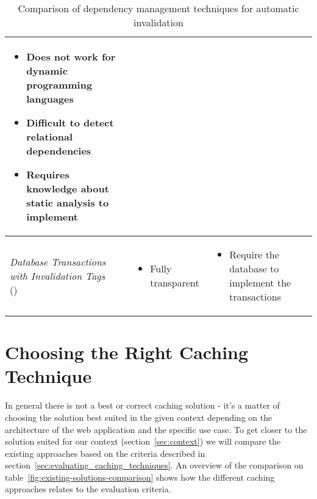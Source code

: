 \begin{table}[ht!]
\begin{tabular}{lll}
{{\begin{itemize}[leftmargin=0.75em]
          \item Does not work for dynamic programming languages
          \item Difficult to detect relational dependencies
          \item Requires knowledge about static analysis to implement
        \end{itemize}
      }
    } \\
    \hline
    {
      \parbox{3.5cm}{
        \emph{Database Transactions with Invalidation Tags} \\ (\cite{paper:liskov})
      }
    } & {
      \parbox{3.5cm}{
        \begin{itemize}[leftmargin=0.75em]
          \item Fully transparent
        \end{itemize}
      }
    } & {
      \parbox{3.5cm}{
        \begin{itemize}[leftmargin=0.75em]
          \item Require the database to implement the transactions
        \end{itemize}
      }
    } \\
    \hline
  \end{tabular}
  \caption{Comparison of dependency management techniques for automatic invalidation}
  \label{fig:dependency-management-comparison}
\end{table}



\section{Choosing the Right Caching Technique}
\label{sec:choosing_the_right_caching_technique}

In general there is not a best or correct caching solution - it's a matter of choosing the solution best suited in the given context depending on the architecture of the web application and the specific use case. To get closer to the solution suited for our context (section~\ref{sec:context}) we will compare the existing approaches based on the criteria described in section~\ref{sec:evaluating_caching_techniques}. An overview of the comparison on table~\ref{fig:existing-solutions-comparison} shows how the different caching approaches relates to the evaluation criteria.

